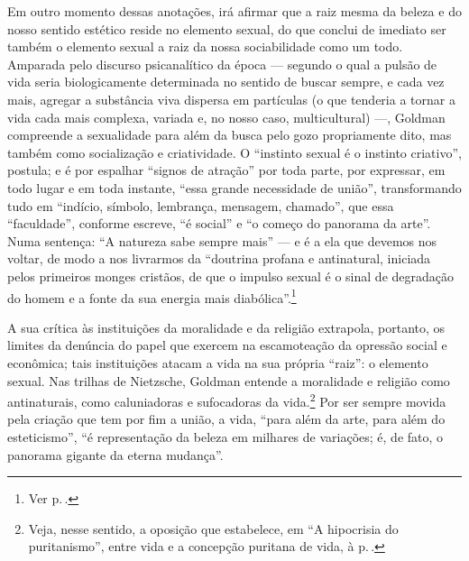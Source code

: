 Em outro momento dessas anotações, irá afirmar que a raiz mesma da beleza e do nosso
sentido estético reside no elemento sexual, do que conclui de imediato
ser também o elemento sexual a raiz da nossa sociabilidade como um todo.
Amparada pelo discurso psicanalítico da época --- segundo o qual a pulsão
de vida seria biologicamente determinada no sentido de buscar sempre, e
cada vez mais, agregar a substância viva dispersa em partículas (o que
tenderia a tornar a vida cada mais complexa, variada e, no nosso caso,
multicultural) ---, Goldman compreende a sexualidade para além da busca
pelo gozo propriamente dito, mas também como socialização e criatividade. O
``instinto sexual é o instinto criativo'', postula; e é por espalhar
``signos de atração'' por toda parte, por expressar, em todo lugar e em
toda instante, ``essa grande necessidade de união'', transformando tudo
em ``indício, símbolo, lembrança, mensagem, chamado'', que essa
``faculdade'', conforme escreve, ``é social'' e ``o começo do panorama
da arte''. Numa sentença: ``A natureza sabe sempre mais'' --- e é a ela
que devemos nos voltar, de modo a nos livrarmos da ``doutrina profana e
antinatural, iniciada pelos primeiros monges cristãos, de que o impulso
sexual é o sinal de degradação do homem e a fonte da sua energia mais
diabólica''.\footnote{Ver p.\,\pageref{diabolica}.}

A sua crítica às instituições da moralidade e da religião extrapola,
portanto, os limites da denúncia do papel que exercem na escamoteação da
opressão social e econômica; tais instituições atacam a vida na sua
própria ``raiz'': o elemento sexual. Nas trilhas de Nietzsche, Goldman
entende a moralidade e religião como antinaturais, como
caluniadoras e sufocadoras da vida.\footnote{Veja, nesse sentido, a oposição que
estabelece, em ``A hipocrisia do puritanismo'', entre vida e a concepção
puritana de vida, à p.\,\pageref{hipocrisia}.} Por ser sempre movida pela criação que tem por fim a
união, a vida, ``para além da arte, para além do esteticismo'',
``é representação da beleza em milhares de variações; é, de fato, o
panorama gigante da eterna mudança''.

